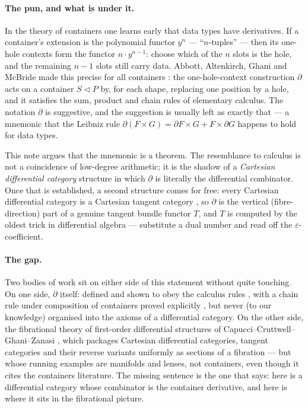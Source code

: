 \documentclass[11pt]{article}
\theoremstyle{definition}
\begin{document}
\paragraph{The pun, and what is under it.}
In the theory of containers one learns early that data types have derivatives. If a container's
extension is the polynomial functor $y^n$ --- ``$n$-tuples'' --- then its one-hole contexts form
the functor $n\cdot y^{n-1}$: choose which of the $n$ slots is the hole, and the remaining $n-1$
slots still carry data. Abbott, Altenkirch, Ghani and McBride made this precise for all
containers \cite{AAGM2003}: the one-hole-context construction $\partial$ acts on a container
$S\lhd P$ by, for each shape, replacing one position by a hole, and it satisfies the sum,
product and chain rules of elementary calculus. The notation $\partial$ is suggestive, and the
suggestion is usually left as exactly that --- a mnemonic that the Leibniz rule
$\partial(F\times G)=\partial F\times G + F\times\partial G$ happens to hold for data types.

This note argues that the mnemonic is a theorem. The resemblance to calculus is not a
coincidence of low-degree arithmetic; it is the shadow of a \emph{Cartesian differential
category} structure \cite{BCS2009} in which $\partial$ is literally the differential combinator.
Once that is established, a second structure comes for free: every Cartesian differential category
is a Cartesian tangent category \cite{CockettCruttwell2014}, so $\partial$ is the vertical
(fibre-direction) part of a genuine tangent bundle functor $T$, and $T$ is computed by the
oldest trick in differential algebra --- substitute a dual number and read off the
$\varepsilon$-coefficient.

\paragraph{The gap.}
Two bodies of work sit on either side of this statement without quite touching. On one side,
$\partial$ itself: defined and shown to obey the calculus rules \cite{AAGM2003}, with a chain
rule under composition of containers proved explicitly \cite{MacBethChainRule}, but never (to our
knowledge) organised into the axioms of a differential category. On the other side, the
fibrational theory of first-order differential structures of
Capucci--Cruttwell--Ghani--Zanasi \cite{CCGZ2024}, which packages Cartesian differential
categories, tangent categories and their reverse variants uniformly as sections of a fibration ---
but whose running examples are manifolds and lenses, not containers, even though it cites the
containers literature. The missing sentence is the one that says: here is a differential category
whose combinator is the container derivative, and here is where it sits in the fibrational
picture.
\end{document}
